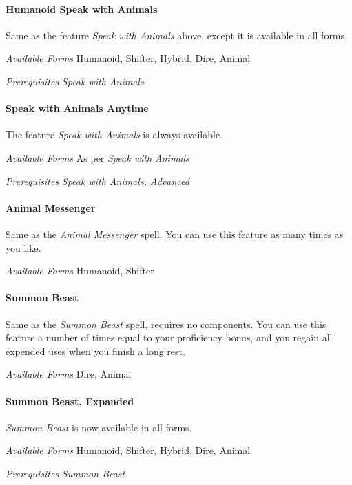 \documentclass[twocolumn]{dndbook}
\begin{document}
\paragraph*{Humanoid Speak with Animals}
Same as the feature \emph{Speak with Animals} above, except it is available in all forms.\par
\emph{Available Forms} Humanoid, Shifter, Hybrid, Dire, Animal\par
\emph{Prerequisites} \emph{Speak with Animals}\par

\paragraph*{Speak with Animals Anytime}
The feature \emph{Speak with Animals} is always available.\par
\emph{Available Forms} As per \emph{Speak with Animals} \par
\emph{Prerequisites} \emph{Speak with Animals, Advanced}\par

\paragraph*{Animal Messenger}
Same as the \emph{Animal Messenger} spell.
You can use this feature as many times as you like.\par
\emph{Available Forms} Humanoid, Shifter\par

\paragraph*{Summon Beast}
Same as the \emph{Summon Beast} spell, requires no components.
You can use this feature a number of times equal to your proficiency bonus, and you regain all expended uses when you finish a long rest.\par
\emph{Available Forms} Dire, Animal\par

\paragraph*{Summon Beast, Expanded}
\emph{Summon Beast} is now available in all forms.\par
\emph{Available Forms} Humanoid, Shifter, Hybrid, Dire, Animal\par
\emph{Prerequisites} \emph{Summon Beast}\par
\end{document}
